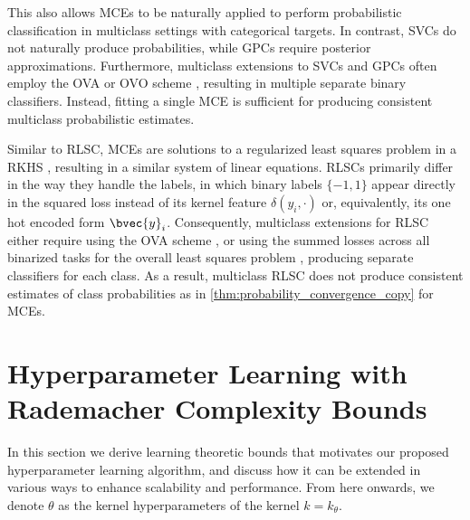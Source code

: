 \documentclass[twoside]{article}
\begin{document}
		This also allows \glspl{MCE} to be naturally applied to perform probabilistic classification in multiclass settings with categorical targets. In contrast, \glspl{SVC} do not naturally produce probabilities, while \glspl{GPC} require posterior approximations. Furthermore, multiclass extensions to \glspl{SVC} and \glspl{GPC} often employ the \gls{OVA} or \gls{OVO} scheme \citep{aly2005survey}, resulting in multiple separate binary classifiers. Instead, fitting a single \gls{MCE} is sufficient for producing consistent multiclass probabilistic estimates.
				
		Similar to \gls{RLSC}, \glspl{MCE} are solutions to a regularized least squares problem in a \gls{RKHS} \citep{lever2012conditional}, resulting in a similar system of linear equations. \glspl{RLSC} primarily differ in the way they handle the labels, in which binary labels $\{-1, 1\}$ appear directly in the squared loss instead of its kernel feature $\delta(y_{i}, \cdot)$ or, equivalently, its one hot encoded form $\bvec{y}_{i}$. Consequently, multiclass extensions for \gls{RLSC} either require using the \gls{OVA} scheme \citep{rifkin2003regularized}, or using the summed losses across all binarized tasks for the overall least squares problem \citep{pahikkala2012unsupervised}, producing separate classifiers for each class. As a result, multiclass \gls{RLSC} does not produce consistent estimates of class probabilities as in \cref{thm:probability_convergence_copy} for \glspl{MCE}.
				
	\section{Hyperparameter Learning with Rademacher Complexity Bounds}
	\label{sec:hyperparameter_learning}
		
		In this section we derive learning theoretic bounds that motivates our proposed hyperparameter learning algorithm, and discuss how it can be extended in various ways to enhance scalability and performance. From here onwards, we denote $\theta$ as the kernel hyperparameters of the kernel $k = k_{\theta}$.
		
\end{document}
